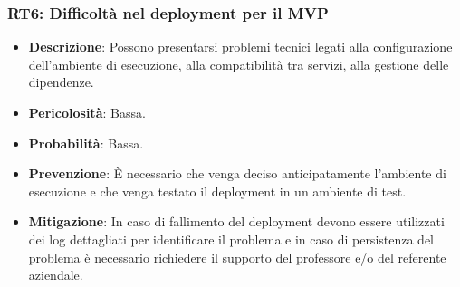 \subsubsection{RT6: Difficoltà nel deployment per il MVP}
\label{rischio:RT6}
\begin{itemize}
    \item \textbf{Descrizione}: Possono presentarsi problemi tecnici legati alla configurazione dell'ambiente di esecuzione, alla compatibilità tra servizi, alla gestione delle dipendenze.
    \item \textbf{Pericolosità}: Bassa.
    \item \textbf{Probabilità}: Bassa.
    \item \textbf{Prevenzione}: È necessario che venga deciso anticipatamente l'ambiente di esecuzione e che venga testato il deployment in un ambiente di test.
    \item \textbf{Mitigazione}: In caso di fallimento del deployment devono essere utilizzati dei log dettagliati per identificare il problema e in caso di persistenza del problema è necessario richiedere il supporto del professore e/o del referente aziendale. 
\end{itemize}